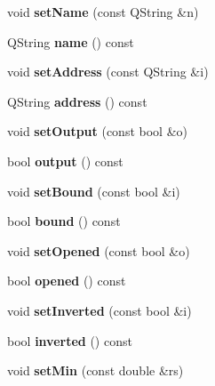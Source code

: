 \begin{DoxyCompactItemize}
void {\bfseries set\+Name} (const Q\+String \&n)
\item 
\mbox{\label{classNode_ac40f16db9ad108a3d8a029802899104c}} 
Q\+String {\bfseries name} () const
\item 
\mbox{\label{classNode_a501c58ee4e1197e670459a80ccc121f7}} 
void {\bfseries set\+Address} (const Q\+String \&i)
\item 
\mbox{\label{classNode_a51460cca215d98243c8efd817713b7e3}} 
Q\+String {\bfseries address} () const
\item 
\mbox{\label{classNode_a1141569603eaccd819188c5dbfa9a9f9}} 
void {\bfseries set\+Output} (const bool \&o)
\item 
\mbox{\label{classNode_a8c4ed49f3a1033f0ebd945170e780231}} 
bool {\bfseries output} () const
\item 
\mbox{\label{classNode_ac0827ecef276b83a1b24306f69258ca4}} 
void {\bfseries set\+Bound} (const bool \&i)
\item 
\mbox{\label{classNode_a9540c4684a7d3d94d08ea673762488b5}} 
bool {\bfseries bound} () const
\item 
\mbox{\label{classNode_ae6c46260f6887d83837ed895cc24c9c4}} 
void {\bfseries set\+Opened} (const bool \&o)
\item 
\mbox{\label{classNode_abe055b7d4469fcce0b3550a2096ab256}} 
bool {\bfseries opened} () const
\item 
\mbox{\label{classNode_a75733c30a1b1f73e439e6030702bc516}} 
void {\bfseries set\+Inverted} (const bool \&i)
\item 
\mbox{\label{classNode_a1f3f2f1e2a3d58b480a9896d14c925ed}} 
bool {\bfseries inverted} () const
\item 
\mbox{\label{classNode_a9281d0e024c9dba7e3ce4ac7f0929a09}} 
void {\bfseries set\+Min} (const double \&rs)
\item 
\mbox{\label{classNode_ab3916a71937c0f290096ba5ceb83e446}} 

\end{DoxyCompactItemize}
